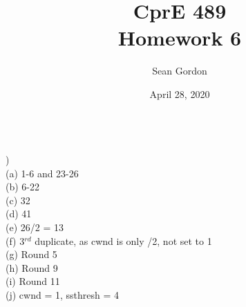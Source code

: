\documentclass[12pt]{article}
\title{CprE 489\\Homework 6}
\author{Sean Gordon}
\date{April 28, 2020}
\begin{document}
\maketitle


\noindent\hrulefill \\


)\\
\indent (a) 1-6 and 23-26\\
\indent (b) 6-22\\
\indent (c) 32\\
\indent (d) 41\\
\indent (e) 26/2 = 13\\
\indent (f) 3$^{rd}$ duplicate, as cwnd is only /2, not set to 1\\
\indent (g) Round 5\\
\indent (h) Round 9\\
\indent (i) Round 11\\
\indent (j) cwnd = 1, ssthresh = 4\\


\noindent\hrulefill \\
\pagebreak

\end{document}
